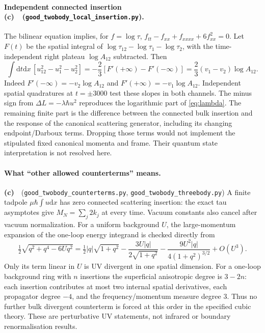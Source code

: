 \documentclass[11pt,a4paper]{article}
\newcommand{\Cc}{\textbf{(c)}\ }
\newcommand{\dd}{\mathrm d}
\newcommand{\file}[1]{\nolinkurl{#1}}
\newcommand{\ct}{\file{good_twobody_counterterms.py}}
\newcommand{\three}{\file{good_twobody_threebody.py}}
\newcommand{\insertcheck}{\file{good_twobody_local_insertion.py}}
\begin{document}
\paragraph{Independent connected insertion \Cc\ (\insertcheck).}
The bilinear equation implies, for \(f=\log\tau\),
\(f_{tt}-f_{xx}+f_{xxxx}+6f_{xx}^2=0\).
Let \(F(t)\) be the spatial integral of
\(\log\tau_{12}-\log\tau_1-\log\tau_2\), with the time-independent
right plateau \(\log A_{12}\) subtracted. Then
\begin{equation}
 \int\dd t\dd x\,[u_{12}^2-u_1^2-u_2^2]
 =-\frac23[F'(+\infty)-F'(-\infty)]
 =\frac23(v_1-v_2)\log A_{12}.
 \label{eq:insertion}
\end{equation}
Indeed \(F'(-\infty)=-v_2\log A_{12}\) and
\(F'(+\infty)=-v_1\log A_{12}\). Independent spatial quadratures
at \(t=\pm3000\) test these slopes in both channels. The minus sign
from \(\Delta L=-\lambda\hbar u^2\) reproduces the logarithmic
part of \eqref{eq:lambda}. The remaining finite part is the difference
between the connected bulk insertion and the response of the canonical
scattering generator, including its changing endpoint/Darboux terms.
Dropping those terms would not implement the stipulated fixed canonical
momenta and frame. Their quantum state interpretation is not resolved here.

\paragraph{What ``other allowed counterterms'' means.}
\Cc\ (\ct, \three) A finite tadpole \(\mu\hbar\int u\dd x\)
has zero connected scattering insertion: the exact tau asymptotes give
\(M_N=\sum_j2k_j\) at every time. Vacuum constants also cancel after
vacuum normalization. For a uniform background \(U\), the large-momentum
expansion of the one-loop energy integrand is checked directly from
\begin{equation}
 \tfrac12\sqrt{q^2+q^4-6Uq^2}
 =\tfrac12|q|\sqrt{1+q^2}
 -\frac{3U|q|}{2\sqrt{1+q^2}}
 -\frac{9U^2|q|}{4(1+q^2)^{3/2}}+O(U^3).
\end{equation}
Only its term linear in \(U\) is UV divergent in one spatial dimension.
For a one-loop background ring with \(n\) insertions the superficial
anisotropic degree is \(3-2n\): each insertion contributes at most
two internal spatial derivatives, each propagator degree \(-4\),
and the frequency/momentum measure degree \(3\). Thus no further
bulk divergent counterterm is forced at this order in the specified
cubic theory. These are perturbative UV statements, not infrared or
boundary renormalisation results.
\end{document}
